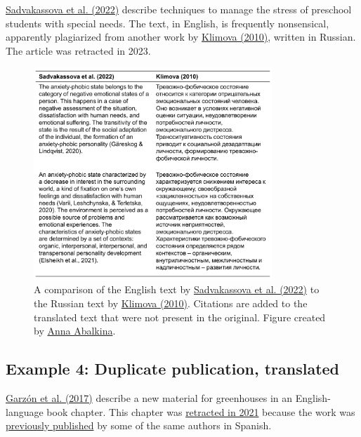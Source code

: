 \documentclass[letterpaper, 12pt]{article}
\begin{document}
\href{https://doi.org/10.1111/mbe.12345}{Sadvakassova et al. (2022)} describe techniques to manage the stress of preschool students with special needs. The text, in English, is frequently nonsensical, apparently plagiarized from another work by \href{https://cyberleninka.ru/article/n/harakteristika-trevozhno-fobicheskogo-sostoyaniya-u-detey-doshkolnogo-vozrasta-s-zaderzhkoy-psihicheskogo-razvitiya-kak}{Klimova (2010)}, written in Russian. The article was retracted in 2023.

\begin{figure}[h!tbp]
    \centering
    \includegraphics[width=0.8\textwidth]{img/plagiarism/sadvakassova_klimova.pdf}
    \caption*{A comparison of the English text by \href{https://doi.org/10.1111/mbe.12345}{Sadvakassova et al. (2022)} to the Russian text by \href{https://cyberleninka.ru/article/n/harakteristika-trevozhno-fobicheskogo-sostoyaniya-u-detey-doshkolnogo-vozrasta-s-zaderzhkoy-psihicheskogo-razvitiya-kak}{Klimova (2010)}. Citations are added to the translated text that were not present in the original. Figure created by \href{https://pubpeer.com/publications/A6C5007F7D6DF81B20F72098A04F20\#2}{Anna Abalkina}.}
\end{figure}

\pagebreak

\subsection*{Example 4: Duplicate publication, translated}

\href{https://doi.org/10.1007/978-3-319-51859-6_14}{Garz\'on et al. (2017)} describe a new material for greenhouses in an English-language book chapter. This chapter was \href{https://doi.org/10.1007/978-3-319-51859-6_20}{retracted in 2021} because the work was \href{https://ingenieriacivil.cedex.es/index.php/ingenieria-civil/article/view/521}{previously published} by some of the same authors in Spanish.
\end{document}
